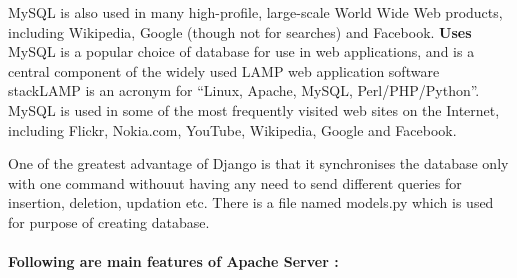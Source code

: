          MySQL is also used in many high-profile, large-scale World Wide Web products, including
Wikipedia, Google (though not for searches) and Facebook.
{\bf Uses} MySQL is a popular choice of database for use in web applications, and is a central component of the widely used LAMP web application software stackLAMP is an acronym for “Linux, Apache, MySQL, Perl/PHP/Python”.\\
         MySQL is used in some of the most frequently visited web sites on the Internet, including Flickr, Nokia.com, YouTube, Wikipedia, Google and Facebook.

One of the greatest advantage of Django is that it synchronises the database only with one command withouut having any need to send different queries for insertion, deletion, updation etc. There is a file named models.py which is used for purpose of creating database.\\\\
{\bf Following are main features of Apache Server :}
